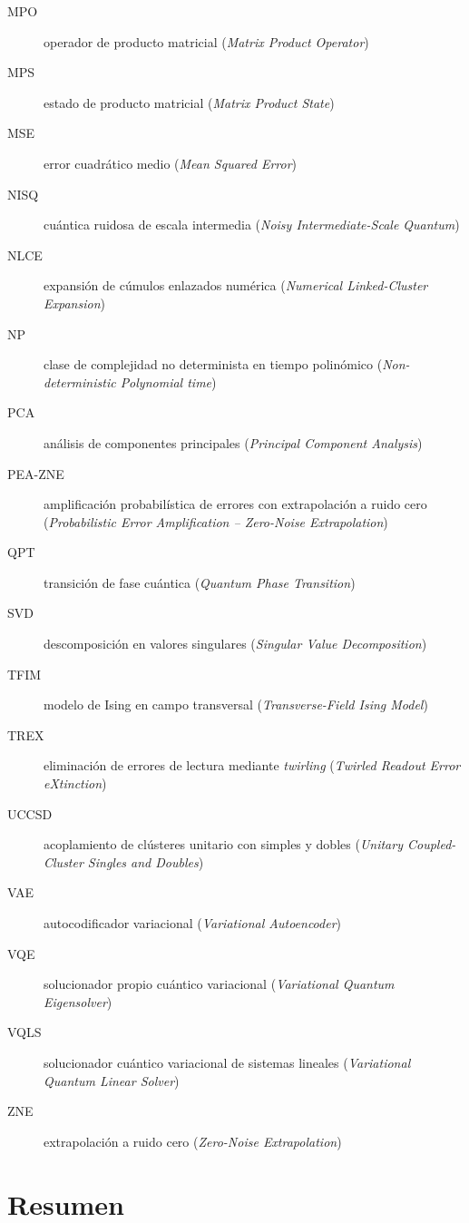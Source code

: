 \documentclass[11pt,a4paper,spanish]{book}
\begin{document}
\begin{description}
\item[MPO] operador de producto matricial (\emph{Matrix Product Operator})
\item[MPS] estado de producto matricial (\emph{Matrix Product State})
\item[MSE] error cuadrático medio (\emph{Mean Squared Error})
\item[NISQ] cuántica ruidosa de escala intermedia (\emph{Noisy Intermediate-Scale Quantum})
\item[NLCE] expansión de cúmulos enlazados numérica (\emph{Numerical Linked-Cluster Expansion})
\item[NP] clase de complejidad no determinista en tiempo polinómico (\emph{Non-deterministic Polynomial time})
\item[PCA] análisis de componentes principales (\emph{Principal Component Analysis})
\item[PEA-ZNE] amplificación probabilística de errores con extrapolación a ruido cero (\emph{Probabilistic Error Amplification -- Zero-Noise Extrapolation})
\item[QPT] transición de fase cuántica (\emph{Quantum Phase Transition})
\item[SVD] descomposición en valores singulares (\emph{Singular Value Decomposition})
\item[TFIM] modelo de Ising en campo transversal (\emph{Transverse-Field Ising Model})
\item[TREX] eliminación de errores de lectura mediante \emph{twirling} (\emph{Twirled Readout Error eXtinction})
\item[UCCSD] acoplamiento de clústeres unitario con simples y dobles (\emph{Unitary Coupled-Cluster Singles and Doubles})
\item[VAE] autocodificador variacional (\emph{Variational Autoencoder})
\item[VQE] solucionador propio cuántico variacional (\emph{Variational Quantum Eigensolver})
\item[VQLS] solucionador cuántico variacional de sistemas lineales (\emph{Variational Quantum Linear Solver})
\item[ZNE] extrapolación a ruido cero (\emph{Zero-Noise Extrapolation})
\end{description}

\chapter{Resumen}
\end{document}
